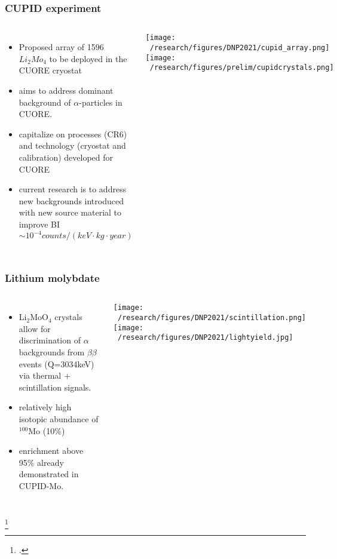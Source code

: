 \documentclass{beamer}
\begin{document}
	\begin{frame}
		\frametitle{CUPID experiment}
		\begin{columns}[c] %
			
			\begin{itemize}
			\item Proposed array of 1596 $Li_2Mo_4$ to be deployed in the CUORE cryostat
			\item aims to address dominant background of $\alpha$-particles in CUORE.
			\item capitalize on processes (CR6) and technology (cryostat and calibration) developed for CUORE
			\item current research is to address new backgrounds introduced with new source material to improve BI $\sim 10^{-4} counts/(keV\cdot  kg\cdot year)$
			\end{itemize}			 
			
		
			\texttt{[image: ~/research/figures/DNP2021/cupid\_array.png]}
			\texttt{[image: ~/research/figures/prelim/cupidcrystals.png]}
			
		\end{columns}
	\end{frame}	
	
		\begin{frame}
		\frametitle{Lithium molybdate}
		\begin{columns}[c] %
			
			\vspace{-2cm}\begin{itemize}
				\setlength\itemsep{2em}
				\item Li$_2$MoO$_4$ crystals allow for discrimination of $\alpha$ backgrounds from $\beta\beta$ events (Q=3034keV) via thermal + scintillation signals.
				\item relatively high isotopic abundance of $^{100}$Mo (10\%)
				\item enrichment above 95\% already demonstrated in CUPID-Mo\footnotemark .
			\end{itemize}
			
			\texttt{[image: ~/research/figures/DNP2021/scintillation.png]}
			\texttt{[image: ~/research/figures/DNP2021/lightyield.jpg]}
		\end{columns}
		\vspace{-2cm}\footcitetext{arxiv.org/abs/1909.02994}
	\end{frame}
	
\end{document}
